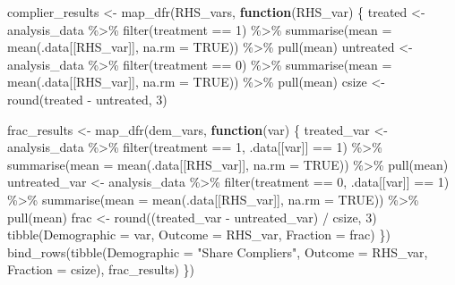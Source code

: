 \documentclass[
  letterpaper,
  DIV=11,
  numbers=noendperiod]{scrartcl}
\newenvironment{Shaded}{\begin{snugshade}}{\end{snugshade}}
\newcommand{\AttributeTok}[1]{\textcolor[rgb]{0.40,0.45,0.13}{#1}}
\newcommand{\ConstantTok}[1]{\textcolor[rgb]{0.56,0.35,0.01}{#1}}
\newcommand{\ControlFlowTok}[1]{\textcolor[rgb]{0.00,0.23,0.31}{\textbf{#1}}}
\newcommand{\DecValTok}[1]{\textcolor[rgb]{0.68,0.00,0.00}{#1}}
\newcommand{\FunctionTok}[1]{\textcolor[rgb]{0.28,0.35,0.67}{#1}}
\newcommand{\NormalTok}[1]{\textcolor[rgb]{0.00,0.23,0.31}{#1}}
\newcommand{\OtherTok}[1]{\textcolor[rgb]{0.00,0.23,0.31}{#1}}
\newcommand{\SpecialCharTok}[1]{\textcolor[rgb]{0.37,0.37,0.37}{#1}}
\newcommand{\StringTok}[1]{\textcolor[rgb]{0.13,0.47,0.30}{#1}}
\begin{document}
\begin{Shaded}
\begin{Highlighting}[]
\NormalTok{complier\_results }\OtherTok{\textless{}{-}} \FunctionTok{map\_dfr}\NormalTok{(RHS\_vars, }\ControlFlowTok{function}\NormalTok{(RHS\_var) \{}
\NormalTok{  treated }\OtherTok{\textless{}{-}}\NormalTok{ analysis\_data }\SpecialCharTok{\%\textgreater{}\%} \FunctionTok{filter}\NormalTok{(treatment }\SpecialCharTok{==} \DecValTok{1}\NormalTok{) }\SpecialCharTok{\%\textgreater{}\%} \FunctionTok{summarise}\NormalTok{(}\AttributeTok{mean =} \FunctionTok{mean}\NormalTok{(.data[[RHS\_var]], }\AttributeTok{na.rm =} \ConstantTok{TRUE}\NormalTok{)) }\SpecialCharTok{\%\textgreater{}\%} \FunctionTok{pull}\NormalTok{(mean)}
\NormalTok{  untreated }\OtherTok{\textless{}{-}}\NormalTok{ analysis\_data }\SpecialCharTok{\%\textgreater{}\%} \FunctionTok{filter}\NormalTok{(treatment }\SpecialCharTok{==} \DecValTok{0}\NormalTok{) }\SpecialCharTok{\%\textgreater{}\%} \FunctionTok{summarise}\NormalTok{(}\AttributeTok{mean =} \FunctionTok{mean}\NormalTok{(.data[[RHS\_var]], }\AttributeTok{na.rm =} \ConstantTok{TRUE}\NormalTok{)) }\SpecialCharTok{\%\textgreater{}\%} \FunctionTok{pull}\NormalTok{(mean)}
\NormalTok{  csize }\OtherTok{\textless{}{-}} \FunctionTok{round}\NormalTok{(treated }\SpecialCharTok{{-}}\NormalTok{ untreated, }\DecValTok{3}\NormalTok{)}
  
\NormalTok{  frac\_results }\OtherTok{\textless{}{-}} \FunctionTok{map\_dfr}\NormalTok{(dem\_vars, }\ControlFlowTok{function}\NormalTok{(var) \{}
\NormalTok{    treated\_var }\OtherTok{\textless{}{-}}\NormalTok{ analysis\_data }\SpecialCharTok{\%\textgreater{}\%} \FunctionTok{filter}\NormalTok{(treatment }\SpecialCharTok{==} \DecValTok{1}\NormalTok{, .data[[var]] }\SpecialCharTok{==} \DecValTok{1}\NormalTok{) }\SpecialCharTok{\%\textgreater{}\%} \FunctionTok{summarise}\NormalTok{(}\AttributeTok{mean =} \FunctionTok{mean}\NormalTok{(.data[[RHS\_var]], }\AttributeTok{na.rm =} \ConstantTok{TRUE}\NormalTok{)) }\SpecialCharTok{\%\textgreater{}\%} \FunctionTok{pull}\NormalTok{(mean)}
\NormalTok{    untreated\_var }\OtherTok{\textless{}{-}}\NormalTok{ analysis\_data }\SpecialCharTok{\%\textgreater{}\%} \FunctionTok{filter}\NormalTok{(treatment }\SpecialCharTok{==} \DecValTok{0}\NormalTok{, .data[[var]] }\SpecialCharTok{==} \DecValTok{1}\NormalTok{) }\SpecialCharTok{\%\textgreater{}\%} \FunctionTok{summarise}\NormalTok{(}\AttributeTok{mean =} \FunctionTok{mean}\NormalTok{(.data[[RHS\_var]], }\AttributeTok{na.rm =} \ConstantTok{TRUE}\NormalTok{)) }\SpecialCharTok{\%\textgreater{}\%} \FunctionTok{pull}\NormalTok{(mean)}
\NormalTok{    frac }\OtherTok{\textless{}{-}} \FunctionTok{round}\NormalTok{((treated\_var }\SpecialCharTok{{-}}\NormalTok{ untreated\_var) }\SpecialCharTok{/}\NormalTok{ csize, }\DecValTok{3}\NormalTok{)}
    \FunctionTok{tibble}\NormalTok{(}\AttributeTok{Demographic =}\NormalTok{ var, }\AttributeTok{Outcome =}\NormalTok{ RHS\_var, }\AttributeTok{Fraction =}\NormalTok{ frac)}
\NormalTok{  \})}
  \FunctionTok{bind\_rows}\NormalTok{(}\FunctionTok{tibble}\NormalTok{(}\AttributeTok{Demographic =} \StringTok{"Share Compliers"}\NormalTok{, }\AttributeTok{Outcome =}\NormalTok{ RHS\_var, }\AttributeTok{Fraction =}\NormalTok{ csize), frac\_results)}
\NormalTok{\})}


\end{Highlighting}
\end{Shaded}
\end{document}
